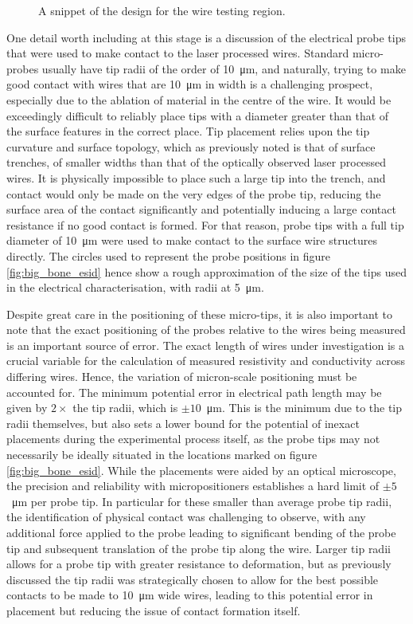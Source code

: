 \begin{refsection}
\begin{figure}
  \caption{A snippet of the design for the wire testing region.}
  \label{fig:big_bone_measurements}
\end{figure}
\label{subsubsec:electrical_probe_placement_error_estimation}
One detail worth including at this stage is a discussion of the electrical probe tips that were used to make contact to the laser processed wires. Standard micro-probes usually have tip radii of the order of 10~\si{\micro\metre}, and naturally, trying to make good contact with wires that are 10~\si{\micro\metre} in width is a challenging prospect, especially due to the ablation of material in the centre of the wire. It would be exceedingly difficult to reliably place tips with a diameter greater than that of the surface features in the correct place. Tip placement relies upon the tip curvature and surface topology, which as previously noted is that of surface trenches, of smaller widths than that of the optically observed laser processed wires. It is physically impossible to place such a large tip into the trench, and contact would only be made on the very edges of the probe tip, reducing the surface area of the contact significantly and potentially inducing a large contact resistance if no good contact is formed. For that reason, probe tips with a full tip diameter of 10~\si{\micro\metre} were used to make contact to the surface wire structures directly. The circles used to represent the probe positions in figure \ref{fig:big_bone_esid} hence show a rough approximation of the size of the tips used in the electrical characterisation, with radii at 5~\si{\micro\metre}. 

Despite great care in the positioning of these micro-tips, it is also important to note that the exact positioning of the probes relative to the wires being measured is an important source of error. The exact length of wires under investigation is a crucial variable for the calculation of measured resistivity and conductivity across differing wires. Hence, the variation of micron-scale positioning must be accounted for. The minimum potential error in electrical path length may be given by $2\times$ the tip radii, which is $\pm10$~\si{\micro\metre}. This is the minimum due to the tip radii themselves, but also sets a lower bound for the potential of inexact placements during the experimental process itself, as the probe tips may not necessarily be ideally situated in the locations marked on figure \ref{fig:big_bone_esid}. While the placements were aided by an optical microscope, the precision and reliability with micropositioners establishes a hard limit of $\pm5$~\si{\micro\metre} per probe tip. In particular for these smaller than average probe tip radii, the identification of physical contact was challenging to observe, with any additional force applied to the probe leading to significant bending of the probe tip and subsequent translation of the probe tip along the wire. Larger tip radii allows for a probe tip with greater resistance to deformation, but as previously discussed the tip radii was strategically chosen to allow for the best possible contacts to be made to 10~\si{\micro\metre} wide wires, leading to this potential error in placement but reducing the issue of contact formation itself.


\end{refsection}
